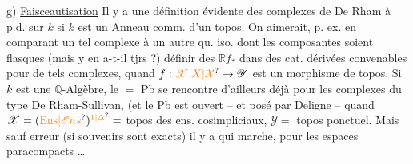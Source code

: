 g) \uline{Faisceautisation} Il y a une définition évidente des complexes de De Rham à p.d. sur $k$ si $k$ est un Anneau comm. d'un topos. On aimerait, p. ex. en comparant un tel complexe à un autre qu. iso. dont les composantes soient flasques (mais y en a-t-il tjrs ?) définir des  $\mathbb R f_\ast$ dans des cat. dérivées convenables pour de tels complexes, quand $f:\unsure{\mathscr X|X|\mathcal X}\to\mathscr Y$ est un morphisme de topos.  Si $k$ est une $\mathbb Q$-Algèbre, le $=$ Pb se rencontre d'ailleurs déjà pour les complexes du type De Rham-Sullivan, (et le Pb est ouvert -- et posé par Deligne -- quand $\mathscr X=(\unsure{\mathrm{Ens}|\mathscr Ens})^{\unsure{1|\Delta}}=$ topos des ens. cosimpliciaux, $\mathscr Y=$ topos ponctuel. Mais sauf erreur (si souvenirs sont exacts) il y a   qui marche, pour les espaces  paracompacts \ldots

